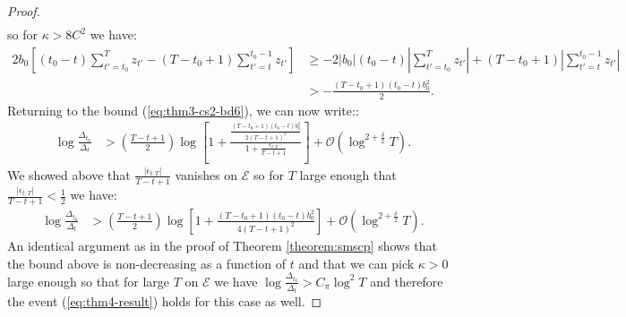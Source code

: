 \begin{proof}
\begin{align*}
\end{align*}
so for $\kappa > 8C^2$ we have: 
\begin{align*}
    2b_0\left[(t_0-t)\sum_{t'=t_0}^{T} z_{t'} - (T-t_0+1)\sum_{t'=t}^{t_0-1} z_{t'}\right] &\geq - 2|b_0|(t_0-t)\left|\sum_{t'=t_0}^{T} z_{t'}\right| + (T-t_0+1)\left|\sum_{t'=t}^{t_0-1} z_{t'}\right| \\
    &> - \frac{(T-t_0+1)(t_0-t)b_0^2}{2}.
\end{align*}
Returning to the bound (\ref{eq:thm3-cs2-bd6}), we can now write::
\begin{align*}
    \log \frac{\Delta_{t_0}}{\Delta_t} &> \left(\frac{T - t +1}{2}\right)\log\left[1 +\frac{\frac{(T-t_0+1)(t_0-t)b_0^2}{2(T-t+1)^2}}{1 + \frac{\epsilon_{t:T}}{T-t+1}} \right] + \mathcal{O}\left(\log^{2+\frac{\delta}{2}} T\right).
\end{align*}
We showed above that $\frac{|\epsilon_{t:T}|}{T-t+1}$ vanishes on $\mathcal{E}$ so for $T$ large enough that $\frac{|\epsilon_{t:T}|}{T-t+1} < \frac{1}{2}$ we have:
\begin{align*}
    \log \frac{\Delta_{t_0}}{\Delta_t} &> \left(\frac{T - t +1}{2}\right)\log\left[1 +\frac{(T-t_0+1)(t_0-t)b_0^2}{4(T-t+1)^2} \right] +\mathcal{O}\left(\log^{2+\frac{\delta}{2}} T\right).
\end{align*}
An identical argument as in the proof of Theorem \ref{theorem:smscp} shows that the bound above is non-decreasing as a function of $t$ and that we can pick $\kappa > 0$ large enough so that for large $T$ on $\mathcal{E}$ we have $ \log \frac{\Delta_{t_0}}{\Delta_t} > C_\pi\log^{2} T $ and therefore the event (\ref{eq:thm4-result}) holds for this case as well.

\end{proof}
